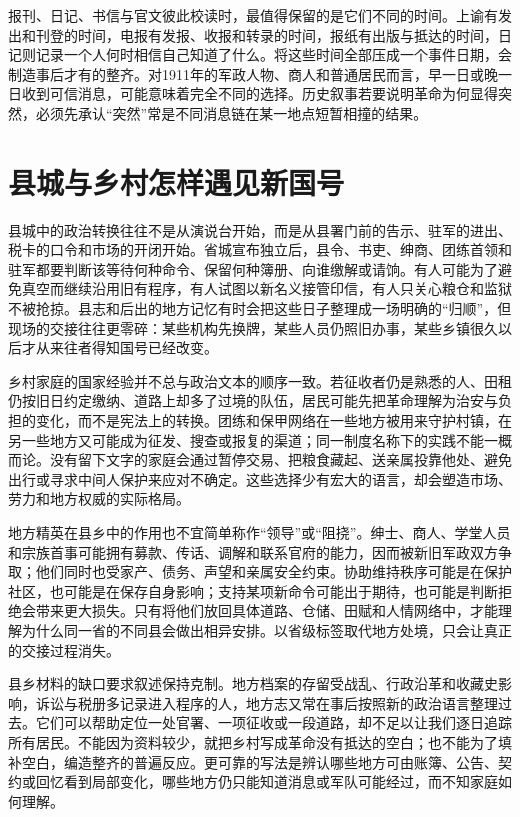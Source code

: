 报刊、日记、书信与官文彼此校读时，最值得保留的是它们不同的时间。上谕有发出和刊登的时间，电报有发报、收报和转录的时间，报纸有出版与抵达的时间，日记则记录一个人何时相信自己知道了什么。将这些时间全部压成一个事件日期，会制造事后才有的整齐。对1911年的军政人物、商人和普通居民而言，早一日或晚一日收到可信消息，可能意味着完全不同的选择。历史叙事若要说明革命为何显得突然，必须先承认“突然”常是不同消息链在某一地点短暂相撞的结果。

\section{县城与乡村怎样遇见新国号}

县城中的政治转换往往不是从演说台开始，而是从县署门前的告示、驻军的进出、税卡的口令和市场的开闭开始。省城宣布独立后，县令、书吏、绅商、团练首领和驻军都要判断该等待何种命令、保留何种簿册、向谁缴解或请饷。有人可能为了避免真空而继续沿用旧有程序，有人试图以新名义接管印信，有人只关心粮仓和监狱不被抢掠。县志和后出的地方记忆有时会把这些日子整理成一场明确的“归顺”，但现场的交接往往更零碎：某些机构先换牌，某些人员仍照旧办事，某些乡镇很久以后才从来往者得知国号已经改变。

乡村家庭的国家经验并不总与政治文本的顺序一致。若征收者仍是熟悉的人、田租仍按旧日约定缴纳、道路上却多了过境的队伍，居民可能先把革命理解为治安与负担的变化，而不是宪法上的转换。团练和保甲网络在一些地方被用来守护村镇，在另一些地方又可能成为征发、搜查或报复的渠道；同一制度名称下的实践不能一概而论。没有留下文字的家庭会通过暂停交易、把粮食藏起、送亲属投靠他处、避免出行或寻求中间人保护来应对不确定。这些选择少有宏大的语言，却会塑造市场、劳力和地方权威的实际格局。

地方精英在县乡中的作用也不宜简单称作“领导”或“阻挠”。绅士、商人、学堂人员和宗族首事可能拥有募款、传话、调解和联系官府的能力，因而被新旧军政双方争取；他们同时也受家产、债务、声望和亲属安全约束。协助维持秩序可能是在保护社区，也可能是在保存自身影响；支持某项新命令可能出于期待，也可能是判断拒绝会带来更大损失。只有将他们放回具体道路、仓储、田赋和人情网络中，才能理解为什么同一省的不同县会做出相异安排。以省级标签取代地方处境，只会让真正的交接过程消失。

县乡材料的缺口要求叙述保持克制。地方档案的存留受战乱、行政沿革和收藏史影响，诉讼与税册多记录进入程序的人，地方志又常在事后按照新的政治语言整理过去。它们可以帮助定位一处官署、一项征收或一段道路，却不足以让我们逐日追踪所有居民。不能因为资料较少，就把乡村写成革命没有抵达的空白；也不能为了填补空白，编造整齐的普遍反应。更可靠的写法是辨认哪些地方可由账簿、公告、契约或回忆看到局部变化，哪些地方仍只能知道消息或军队可能经过，而不知家庭如何理解。

